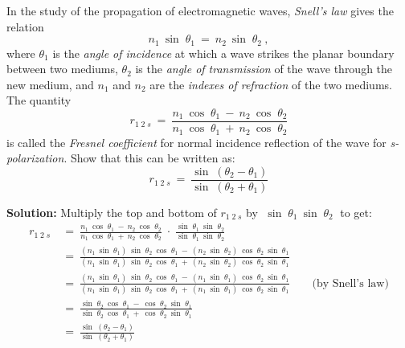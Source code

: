 \begin{exmp}\label{exmp:fresnel}
 In the study of the propagation of electromagnetic waves,
 \emph{Snell's law} gives the relation
 \begin{equation}
  n_1 ~\sin\;\theta_1 ~=~ n_2 ~\sin\;\theta_2\label{eqn:snell} ~,
 \end{equation}
 where $\theta_1$ is the \emph{angle of incidence} at which a wave
 strikes the planar boundary between two mediums, $\theta_2$ is the \emph{angle of
 transmission} of the wave through the new medium, and $n_1$ and $n_2$
 are the \emph{indexes of refraction} of the two mediums. The quantity
 \begin{equation}\label{eqn:fresnelsr}
  r_{1\;2\;s} ~=~ \frac{n_1 ~\cos\;\theta_1 ~-~ n_2 ~\cos\;\theta_2}{n_1 ~\cos\;\theta_1 ~+~
  n_2 ~\cos\;\theta_2}
 \end{equation}
 is called the \emph{Fresnel coefficient} for normal
 incidence reflection of the wave for \emph{s-polarization}. Show that this can be written as:
 \begin{displaymath}
  r_{1\;2\;s} ~=~ \frac{\sin\;(\theta_2 - \theta_1)}{\sin\;(\theta_2 + \theta_1)}
 \end{displaymath}
 \par\noindent\textbf{Solution:} Multiply the top and bottom of $r_{1\;2\;s}$ by $\;\sin\;\theta_1 ~
 \sin\;\theta_2\;$ to get:
 \begin{align*}
  r_{1\;2\;s} ~&=~ \frac{n_1 ~\cos\;\theta_1 ~-~ n_2 ~\cos\;\theta_2}{n_1 ~\cos\;\theta_1 ~+~
   n_2 ~\cos\;\theta_2} \;\cdot\; \frac{\sin\;\theta_1 ~ \sin\;\theta_2}{\sin\;\theta_1 ~
   \sin\;\theta_2}\\[7pt]
  &=~ \frac{(n_1 ~\sin\;\theta_1)~\sin\;\theta_2 ~\cos\;\theta_1 ~-~
            (n_2 ~\sin\;\theta_2)~\cos\;\theta_2 ~\sin\;\theta_1}{
            (n_1 ~\sin\;\theta_1)~\sin\;\theta_2 ~\cos\;\theta_1 ~+~
            (n_2 ~\sin\;\theta_2)~\cos\;\theta_2 ~\sin\;\theta_1}\\[7pt]
  &=~ \frac{(n_1 ~\sin\;\theta_1)~\sin\;\theta_2 ~\cos\;\theta_1 ~-~
            (n_1 ~\sin\;\theta_1)~\cos\;\theta_2 ~\sin\;\theta_1}{
            (n_1 ~\sin\;\theta_1)~\sin\;\theta_2 ~\cos\;\theta_1 ~+~
            (n_1 ~\sin\;\theta_1)~\cos\;\theta_2 ~\sin\;\theta_1}
			\qquad\text{(by Snell's law)}\\[7pt]
  &=~ \frac{\sin\;\theta_2 ~\cos\;\theta_1 ~-~
           \cos\;\theta_2 ~\sin\;\theta_1}{
           \sin\;\theta_2 ~\cos\;\theta_1 ~+~
           \cos\;\theta_2 ~\sin\;\theta_1}\\[7pt]
  &=~ \frac{\sin\;(\theta_2 - \theta_1)}{\sin\;(\theta_2 + \theta_1)}
 \end{align*}
\end{exmp}\vspace{-2mm}
\divider
\vspace{1mm}


